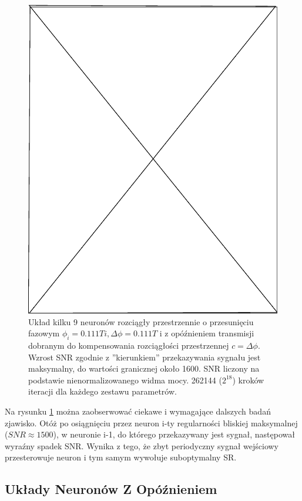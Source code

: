   \begin{figure}
    \includegraphics[width=120mm]{images/pending}
    \caption{Układ kilku 9 neuronów rozciągły przestrzennie o przesunięciu fazowym $\phi_i = 0.111 T i, \Delta \phi = 0.111 T$ i z opóźnieniem transmisji dobranym do kompensowania rozciągłości przestrzennej $c = \Delta \phi$. Wzrost SNR zgodnie z ''kierunkiem'' przekazywania sygnału jest maksymalny, do wartości granicznej około 1600. SNR liczony na podstawie nienormalizowanego widma mocy. 262144 ($2^{18}$) kroków iteracji dla każdego zestawu parametrów.}
    \label{fig:graphics:sim:2010_10_03}
  \end{figure}

  Na rysunku \ref{fig:graphics:sim:2010_10_03} można zaobserwować ciekawe i wymagające dalszych badań zjawisko. Otóż po osiągnięciu przez neuron i-ty regularności bliskiej maksymalnej ($SNR \approx 1500$), w neuronie i-1, do którego przekazywany jest sygnał, następował wyraźny spadek SNR. Wynika z tego, że zbyt periodyczny sygnał wejściowy przesterowuje neuron i tym samym wywołuje suboptymalny SR.

  
  \subsection{Układy Neuronów Z Opóźnieniem}
  
